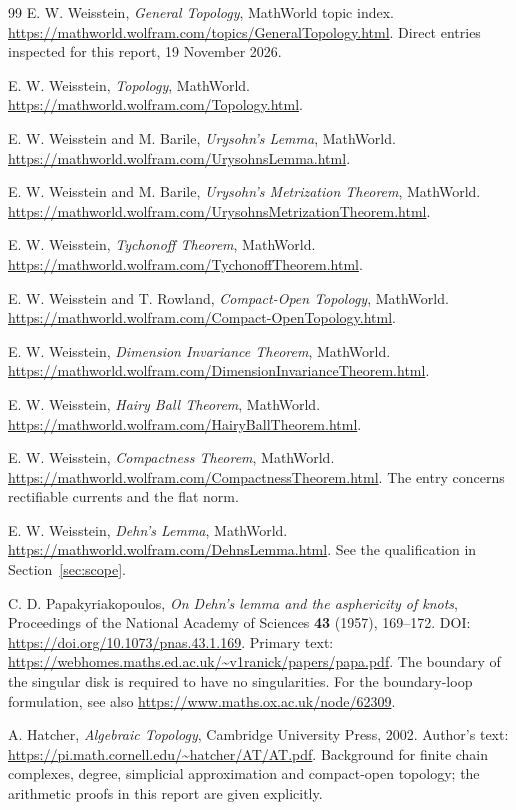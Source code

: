 \begin{thebibliography}{99}
E. W. Weisstein, \emph{General Topology}, MathWorld topic index.
\url{https://mathworld.wolfram.com/topics/GeneralTopology.html}.
Direct entries inspected for this report, 19 November 2026.

E. W. Weisstein, \emph{Topology}, MathWorld.
\url{https://mathworld.wolfram.com/Topology.html}.

E. W. Weisstein and M. Barile, \emph{Urysohn's Lemma}, MathWorld.
\url{https://mathworld.wolfram.com/UrysohnsLemma.html}.

E. W. Weisstein and M. Barile, \emph{Urysohn's Metrization Theorem}, MathWorld.
\url{https://mathworld.wolfram.com/UrysohnsMetrizationTheorem.html}.

E. W. Weisstein, \emph{Tychonoff Theorem}, MathWorld.
\url{https://mathworld.wolfram.com/TychonoffTheorem.html}.

E. W. Weisstein and T. Rowland, \emph{Compact-Open Topology}, MathWorld.
\url{https://mathworld.wolfram.com/Compact-OpenTopology.html}.

E. W. Weisstein, \emph{Dimension Invariance Theorem}, MathWorld.
\url{https://mathworld.wolfram.com/DimensionInvarianceTheorem.html}.

E. W. Weisstein, \emph{Hairy Ball Theorem}, MathWorld.
\url{https://mathworld.wolfram.com/HairyBallTheorem.html}.

E. W. Weisstein, \emph{Compactness Theorem}, MathWorld.
\url{https://mathworld.wolfram.com/CompactnessTheorem.html}.
The entry concerns rectifiable currents and the flat norm.

E. W. Weisstein, \emph{Dehn's Lemma}, MathWorld.
\url{https://mathworld.wolfram.com/DehnsLemma.html}.
See the qualification in Section~\ref{sec:scope}.

C. D. Papakyriakopoulos, \emph{On Dehn's lemma and the asphericity of knots},
Proceedings of the National Academy of Sciences \textbf{43} (1957), 169--172.
DOI: \url{https://doi.org/10.1073/pnas.43.1.169}.
Primary text: \url{https://webhomes.maths.ed.ac.uk/~v1ranick/papers/papa.pdf}.
The boundary of the singular disk is required to have no singularities.
For the boundary-loop formulation, see also
\url{https://www.maths.ox.ac.uk/node/62309}.

A. Hatcher, \emph{Algebraic Topology}, Cambridge University Press, 2002.
Author's text: \url{https://pi.math.cornell.edu/~hatcher/AT/AT.pdf}.
Background for finite chain complexes, degree, simplicial approximation and compact-open topology; the arithmetic proofs in this report are given explicitly.


\end{thebibliography}
